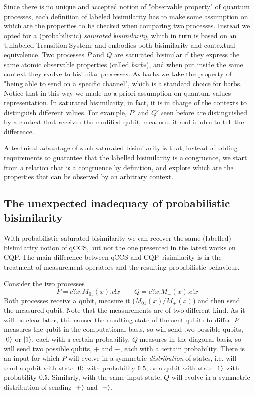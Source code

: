 Since there  is no unique and accepted notion of "observable property" of quantum processes, each definition of labeled bisimilarity has to make some assumption on which are the properties to be checked when comparing two processes. Instead we opted for a (probabilistic) \textit{saturated bisimilarity}, which in turn is based on an Unlabeled Transition System, and embodies both bisimilarity and contextual equivalence. Two processes $P$ and $Q$ are saturated bisimilar if they express the same atomic observable properties (called \textit{barbs}), and when put inside the same context they evolve to bisimilar processes. As barbs we take the property of "being able to send on a specific channel", which  is a standard choice for barbs. Notice that in this way we made no a-priori assumption on quantum values representation. In saturated bisimilarity, in fact, it is in charge of the contexts to distinguish different values. For example, $P'$ and $Q'$ seen before are distinguished by a context that receives the modified qubit, measures it and is able to tell the difference.

A technical advantage of such saturated bisimilarity is that, instead of adding requirements to guarantee that the labelled bisimilarity is a congruence, we start from a relation that is a congruence by definition, and explore which are the properties that can be observed by an arbitrary context.


\subsection*{The unexpected inadequacy of probabilistic bisimilarity}

With probabilistic saturated bisimilarity we can recover the same (labelled) bisimilarity notion of qCCS, but not the one presented in the latest works on CQP. The main difference between qCCS and CQP bisimilarity is in the treatment of measurement operators and the resulting probabilistic behaviour.

Consider the two processes 
\[P = c?x.M_{01}(x).c!x \qquad Q = c?x.M_\pm(x).c!x\]
Both processes receive a qubit, measure it ($M_{01}(x) / M_{\pm}(x)$) and then send the measured qubit. Note that the measurements are of two different kind. As it will be clear later, this causes the resulting state of the sent qubits to differ. $P$ measures the qubit in the computational basis, so will send two possible qubits, $\ket{0}$ or $\ket{1}$, each with a certain probability. $Q$ measures in the diagonal basis, so will send two possible qubits, $+$ and $-$, each with a certain probability. There is an input for which $P$ will evolve in a symmetric \textit{distribution} of states, i.e. will send a qubit with state $\ket{0}$ with probability $0.5$, or a qubit with state $\ket{1}$ with probability $0.5$. Similarly, with the same input state, $Q$ will evolve in a symmetric distribution of sending $\ket{+}$ and $\ket{-}$.

